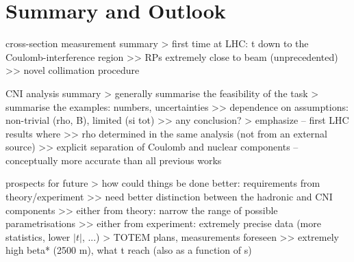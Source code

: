 \section{Summary and Outlook}

\> cross-section measurement summary
\>> first time at LHC: t down to the Coulomb-interference region
\>>> RPs extremely close to beam (unprecedented)
\>>> novel collimation procedure


\> CNI analysis summary
\>> generally summarise the feasibility of the task
\>> summarise the examples: numbers, uncertainties
\>>> dependence on assumptions: non-trivial (rho, B), limited (si tot)
\>>> any conclusion?
\>> emphasize -- first LHC results where
\>>> rho determined in the same analysis (not from an external source)
\>>> explicit separation of Coulomb and nuclear components -- conceptually more accurate than all previous works


\> prospects for future
\>> how could things be done better: requirements from theory/experiment
\>>> need better distinction between the hadronic and CNI components
\>>> either from theory: narrow the range of possible parametrisations
\>>> either from experiment: extremely precise data (more statistics, lower $|t|$, ...)
\>> TOTEM plans, measurements foreseen
\>>> extremely high beta* (2500 m), what t reach (also as a function of s)
